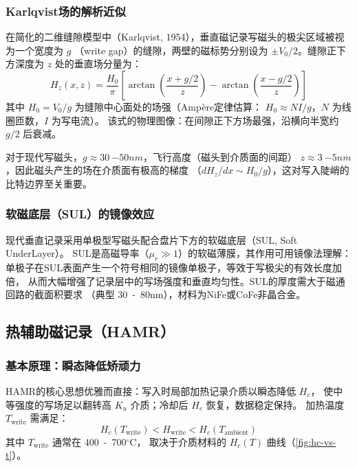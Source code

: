 \documentclass[11pt,a4paper,twoside]{article}
\newcommand{\degC}{\ensuremath{{}^{\circ}\mathrm{C}}}
\theoremstyle{definition}
\theoremstyle{plain}
\theoremstyle{remark}
\begin{document}
\subsubsection{Karlqvist场的解析近似}

在简化的二维缝隙模型中（Karlqvist, 1954），垂直磁记录写磁头的极尖区域被视为一个宽度为 $g$
（write gap）的缝隙，两壁的磁标势分别设为 $\pm V_0/2$。缝隙正下方深度为 $z$ 处的垂直场分量为：
\begin{equation}\label{eq:karlqvist}
  H_z(x,z) = \frac{H_0}{\pi} \left[
    \arctan\!\left(\frac{x + g/2}{z}\right)
    - \arctan\!\left(\frac{x - g/2}{z}\right)
  \right]
\end{equation}
其中 $H_0 = V_0 / g$ 为缝隙中心面处的场强（Amp\`{e}re定律估算：
$H_0 \approx N I / g$，$N$ 为线圈匝数，$I$ 为写电流）。
该式的物理图像：在间隙正下方场最强，沿横向半宽约 $g/2$ 后衰减。

对于现代写磁头，$g \approx \SI{30}{-50}{nm}$，飞行高度（磁头到介质面的间距）
$z \approx \SI{3}{-5}{nm}$，因此磁头产生的场在介质面有极高的梯度
（$dH_z/dx \sim H_0 / g$），这对写入陡峭的比特边界至关重要。

\subsubsection{软磁底层（SUL）的镜像效应}

现代垂直记录采用单极型写磁头配合盘片下方的软磁底层（SUL, Soft UnderLayer）。
SUL是高磁导率（$\mu_r \gg 1$）的软磁薄膜，其作用可用镜像法理解：
单极子在SUL表面产生一个符号相同的镜像单极子，等效于写极尖的有效长度加倍，
从而大幅增强了记录层中的写场强度和垂直均匀性。SUL的厚度需大于磁通回路的截面积要求
（典型 \SI{30}{-80}{nm}），材料为NiFe或CoFe非晶合金。

\subsection{热辅助磁记录（HAMR）}
\label{sec:hamr}

\subsubsection{基本原理：瞬态降低矫顽力}

HAMR的核心思想优雅而直接：写入时局部加热记录介质以瞬态降低 $H_c$，
使中等强度的写场足以翻转高 $K_u$ 介质；冷却后 $H_c$ 恢复，数据稳定保持。
加热温度 $T_{\text{write}}$ 需满足：
\begin{equation}
  H_c(T_{\text{write}}) < H_{\text{write}} < H_c(T_{\text{ambient}})
\end{equation}
其中 $T_{\text{write}}$ 通常在 \SI{400}{-700}{\degC{}}，
取决于介质材料的 $H_c(T)$ 曲线（\cref{fig:hc-vs-t}）。
\end{document}
